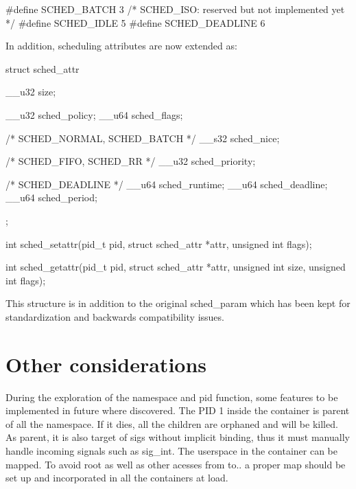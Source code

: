 \documentclass[]{scrartcl}
\begin{document}
#define SCHED\_BATCH		3
/* SCHED\_ISO: reserved but not implemented yet */
#define SCHED\_IDLE		5
#define SCHED\_DEADLINE		6


In addition, scheduling attributes are now extended as:

struct sched\_attr {
	__u32 size;
	
	__u32 sched\_policy;
	__u64 sched\_flags;
	
	/* SCHED\_NORMAL, SCHED\_BATCH */
	__s32 sched\_nice;
	
	/* SCHED\_FIFO, SCHED\_RR */
	__u32 sched_priority;
	
	/* SCHED\_DEADLINE */
	__u64 sched\_runtime;
	__u64 sched\_deadline;
	__u64 sched\_period;
};

       int sched_setattr(pid_t pid, struct sched_attr *attr,
unsigned int flags);

int sched_getattr(pid_t pid, struct sched_attr *attr,
unsigned int size, unsigned int flags);


This structure is in addition to the original sched\_param which has been kept for standardization and backwards compatibility issues.

\section{Other considerations}

During the exploration of the namespace and pid function, some features to be implemented in future where discovered. 
The PID 1 inside the container is parent of all the namespace. If it dies, all the children are orphaned and will be killed. As parent, it is also target of sigs without implicit binding, thus it must manually handle incoming signals such as sig\_int.
The userspace in the container can be mapped. To avoid root as well as other acesses from to.. a proper map should be set up and incorporated in all the containers at load.
\end{document}

